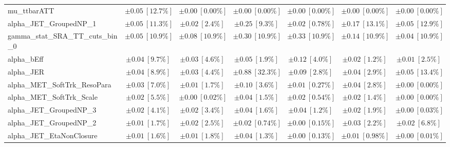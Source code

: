 \begin{sidewaystable}
\begin{center}
\begin{tabular*}{\textwidth}{@{\extracolsep{\fill}}lcccccc}
mu\_ttbarATT         & $\pm 0.05\ [12.7\%] $          & $\pm 0.00\ [0.00\%] $          & $\pm 0.00\ [0.00\%] $          & $\pm 0.00\ [0.00\%] $          & $\pm 0.00\ [0.00\%] $          & $\pm 0.00\ [0.00\%] $       \\
alpha\_JET\_GroupedNP\_1         & $\pm 0.05\ [11.3\%] $          & $\pm 0.02\ [2.4\%] $          & $\pm 0.25\ [9.3\%] $          & $\pm 0.02\ [0.78\%] $          & $\pm 0.17\ [13.1\%] $          & $\pm 0.05\ [12.9\%] $       \\
gamma\_stat\_SRA\_TT\_cuts\_bin\_0         & $\pm 0.05\ [10.9\%] $          & $\pm 0.08\ [10.9\%] $          & $\pm 0.30\ [10.9\%] $          & $\pm 0.33\ [10.9\%] $          & $\pm 0.14\ [10.9\%] $          & $\pm 0.04\ [10.9\%] $       \\
alpha\_bEff         & $\pm 0.04\ [9.7\%] $          & $\pm 0.03\ [4.6\%] $          & $\pm 0.05\ [1.9\%] $          & $\pm 0.12\ [4.0\%] $          & $\pm 0.02\ [1.2\%] $          & $\pm 0.01\ [2.5\%] $       \\
alpha\_JER         & $\pm 0.04\ [8.9\%] $          & $\pm 0.03\ [4.4\%] $          & $\pm 0.88\ [32.3\%] $          & $\pm 0.09\ [2.8\%] $          & $\pm 0.04\ [2.9\%] $          & $\pm 0.05\ [13.4\%] $       \\
alpha\_MET\_SoftTrk\_ResoPara         & $\pm 0.03\ [7.0\%] $          & $\pm 0.01\ [1.7\%] $          & $\pm 0.10\ [3.6\%] $          & $\pm 0.01\ [0.27\%] $          & $\pm 0.04\ [2.8\%] $          & $\pm 0.00\ [0.00\%] $       \\
alpha\_MET\_SoftTrk\_Scale         & $\pm 0.02\ [5.5\%] $          & $\pm 0.00\ [0.02\%] $          & $\pm 0.04\ [1.5\%] $          & $\pm 0.02\ [0.54\%] $          & $\pm 0.02\ [1.4\%] $          & $\pm 0.00\ [0.00\%] $       \\
alpha\_JET\_GroupedNP\_3         & $\pm 0.02\ [4.1\%] $          & $\pm 0.02\ [3.4\%] $          & $\pm 0.04\ [1.6\%] $          & $\pm 0.04\ [1.2\%] $          & $\pm 0.02\ [1.9\%] $          & $\pm 0.00\ [0.03\%] $       \\
alpha\_JET\_GroupedNP\_2         & $\pm 0.01\ [1.7\%] $          & $\pm 0.02\ [2.5\%] $          & $\pm 0.02\ [0.74\%] $          & $\pm 0.00\ [0.15\%] $          & $\pm 0.03\ [2.2\%] $          & $\pm 0.02\ [6.8\%] $       \\
alpha\_JET\_EtaNonClosure         & $\pm 0.01\ [1.6\%] $          & $\pm 0.01\ [1.8\%] $          & $\pm 0.04\ [1.3\%] $          & $\pm 0.00\ [0.13\%] $          & $\pm 0.01\ [0.98\%] $          & $\pm 0.00\ [0.01\%] $       \\

\end{tabular*}
\end{center}
\end{sidewaystable}
